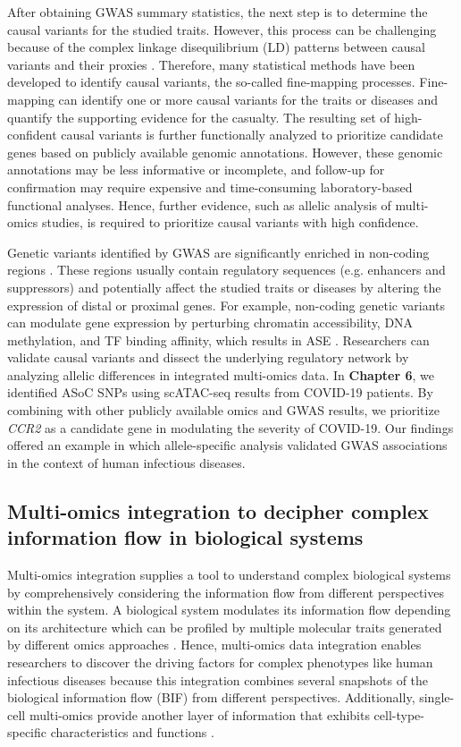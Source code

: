 \documentclass{book}
\begin{document}
\begin{refsection}
After obtaining GWAS summary statistics, the next step is to determine the causal variants for the studied traits.
However, this process can be challenging because of the complex linkage disequilibrium (LD) patterns between causal variants and their proxies \cite{Schaid2018From}.
Therefore, many statistical methods have been developed to identify causal variants, the so-called fine-mapping processes.
Fine-mapping can identify one or more causal variants for the traits or diseases and quantify the supporting evidence for the casualty.
The resulting set of high-confident causal variants is further functionally analyzed to prioritize candidate genes based on publicly available genomic annotations.
However, these genomic annotations may be less informative or incomplete, and follow-up for confirmation may require expensive and time-consuming laboratory-based functional analyses.
Hence, further evidence, such as allelic analysis of multi-omics studies, is required to prioritize causal variants with high confidence.

Genetic variants identified by GWAS are significantly enriched in non-coding regions \cite{Tam2019Benefits,Manolio2013Bringing}.
These regions usually contain regulatory sequences (e.g. enhancers and suppressors) and potentially affect the studied traits or diseases by altering the expression of distal or proximal genes.
For example, non-coding genetic variants can modulate gene expression by perturbing chromatin accessibility, DNA methylation, and TF binding affinity, which results in ASE \cite{Cleary2021Perspectives}.
Researchers can validate causal variants and dissect the underlying regulatory network by analyzing allelic differences in integrated multi-omics data.
In \textbf{Chapter 6}, we identified ASoC SNPs using scATAC-seq results from COVID-19 patients.
By combining with other publicly available omics and GWAS results, we prioritize \textit{CCR2} as a candidate gene in modulating the severity of COVID-19.
Our findings offered an example in which allele-specific analysis validated GWAS associations in the context of human infectious diseases.

\subsection*{Multi-omics integration to decipher complex information flow in biological systems}
Multi-omics integration supplies a tool to understand complex biological systems by comprehensively considering the information flow from different perspectives within the system.
A biological system modulates its information flow depending on its architecture which can be profiled by multiple molecular traits generated by different omics approaches \cite{Hasin2017Multi}.
Hence, multi-omics data integration enables researchers to discover the driving factors for complex phenotypes like human infectious diseases because this integration combines several snapshots of the biological information flow (BIF) from different perspectives.
Additionally, single-cell multi-omics provide another layer of information that exhibits cell-type-specific characteristics and functions \cite{Perkel2021Single}.


\end{refsection}
\end{document}

